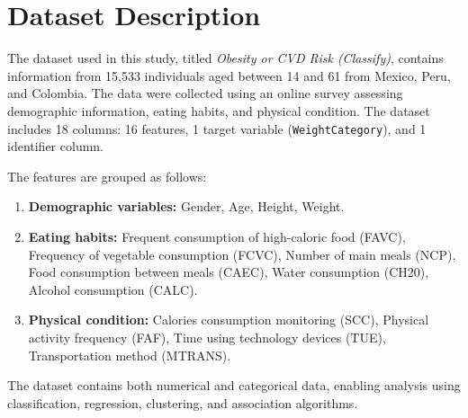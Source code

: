 \chapter{Dataset Description}\label{ch:dataset-description}


The dataset used in this study, titled \textit{Obesity or CVD Risk (Classify)}, contains information from 15,533 individuals aged between 14 and 61 from Mexico, Peru, and Colombia.
The data were collected using an online survey assessing demographic information, eating habits, and physical condition.
The dataset includes 18 columns: 16 features, 1 target variable (\texttt{WeightCategory}), and 1 identifier column.

The features are grouped as follows:

\begin{enumerate}
    \item \textbf{Demographic variables:} Gender, Age, Height, Weight.
    \item \textbf{Eating habits:} Frequent consumption of high-caloric food (FAVC), Frequency of vegetable consumption (FCVC), Number of main meals (NCP), Food consumption between meals (CAEC), Water consumption (CH20), Alcohol consumption (CALC).
    \item \textbf{Physical condition:} Calories consumption monitoring (SCC), Physical activity frequency (FAF), Time using technology devices (TUE), Transportation method (MTRANS).
\end{enumerate}

The dataset contains both numerical and categorical data, enabling analysis using classification, regression, clustering, and association algorithms.





